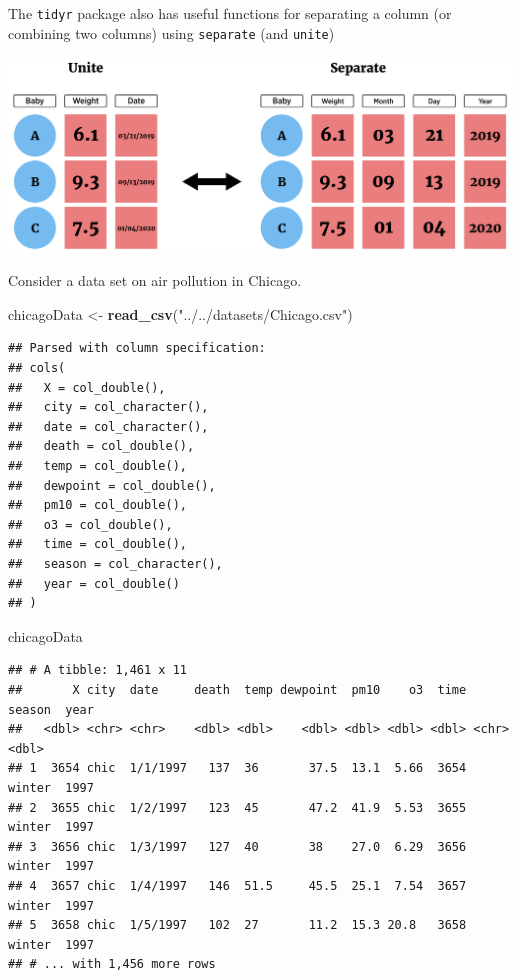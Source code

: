 \documentclass[
]{book}
\newenvironment{Shaded}{\begin{snugshade}}{\end{snugshade}}
\newcommand{\KeywordTok}[1]{\textcolor[rgb]{0.13,0.29,0.53}{\textbf{#1}}}
\newcommand{\NormalTok}[1]{#1}
\newcommand{\StringTok}[1]{\textcolor[rgb]{0.31,0.60,0.02}{#1}}
\theoremstyle{definition}
\theoremstyle{definition}
\theoremstyle{definition}
\theoremstyle{remark}
\begin{document}
The \texttt{tidyr} package also has useful functions for separating a column (or combining two columns) using \texttt{separate} (and \texttt{unite})

\begin{center}\includegraphics[width=0.8\linewidth]{img/uniteSeparateF} \end{center}

Consider a data set on air pollution in Chicago.

\begin{Shaded}
\begin{Highlighting}[]
\NormalTok{chicagoData <-}\StringTok{ }\KeywordTok{read_csv}\NormalTok{(}\StringTok{"../../datasets/Chicago.csv"}\NormalTok{)}
\end{Highlighting}
\end{Shaded}

\begin{verbatim}
## Parsed with column specification:
## cols(
##   X = col_double(),
##   city = col_character(),
##   date = col_character(),
##   death = col_double(),
##   temp = col_double(),
##   dewpoint = col_double(),
##   pm10 = col_double(),
##   o3 = col_double(),
##   time = col_double(),
##   season = col_character(),
##   year = col_double()
## )
\end{verbatim}

\begin{Shaded}
\begin{Highlighting}[]
\NormalTok{chicagoData}
\end{Highlighting}
\end{Shaded}

\begin{verbatim}
## # A tibble: 1,461 x 11
##       X city  date     death  temp dewpoint  pm10    o3  time season  year
##   <dbl> <chr> <chr>    <dbl> <dbl>    <dbl> <dbl> <dbl> <dbl> <chr>  <dbl>
## 1  3654 chic  1/1/1997   137  36       37.5  13.1  5.66  3654 winter  1997
## 2  3655 chic  1/2/1997   123  45       47.2  41.9  5.53  3655 winter  1997
## 3  3656 chic  1/3/1997   127  40       38    27.0  6.29  3656 winter  1997
## 4  3657 chic  1/4/1997   146  51.5     45.5  25.1  7.54  3657 winter  1997
## 5  3658 chic  1/5/1997   102  27       11.2  15.3 20.8   3658 winter  1997
## # ... with 1,456 more rows
\end{verbatim}
\end{document}
